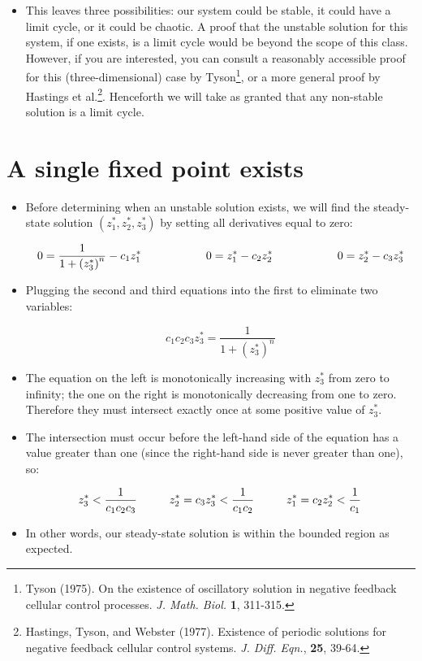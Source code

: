 \documentclass{article}
\begin{document}
\begin{itemize}
\item This leaves three possibilities: our system could be stable, it could have a limit cycle, or it could be chaotic. A proof that the unstable solution for this system, if one exists, is a limit cycle would be beyond the scope of this class. However, if you are interested, you can consult a reasonably accessible proof for this (three-dimensional) case by Tyson\footnote{Tyson (1975). On the existence of oscillatory solution in negative feedback cellular control processes. \textit{J. Math. Biol.} \textbf{1}, 311-315.}, or a more general proof by Hastings et al.\footnote{Hastings, Tyson, and Webster (1977). Existence of periodic solutions for negative feedback cellular control systems. \textit{J. Diff. Eqn.}, \textbf{25}, 39-64.}. Henceforth we will take as granted that any non-stable solution is a limit cycle.
\end{itemize}

\section*{A single fixed point exists}
\begin{itemize}
\item Before determining when an unstable solution exists, we will find the steady-state solution $(z_1^*, z_2^*, z_3^*)$ by setting all derivatives equal to zero:

\[ 0 = \frac{1}{1 + \left( z_3^* \right)^n} - c_1 z_1^* \hspace{2 cm} 0 = z_1^* - c_2z_2^* \hspace{2 cm} 0 = z_2^* - c_3 z_3^* \]

\item Plugging the second and third equations into the first to eliminate two variables:

\[ c_1 c_2 c_3 z_3^* = \frac{1}{1 + \left( z_3^* \right)^n}  \]

\item The equation on the left is monotonically increasing with $z_3^*$ from zero to infinity; the one on the right is monotonically decreasing from one to zero. Therefore they must intersect exactly once at some positive value of $z_3^*$.
\item The intersection must occur before the left-hand side of the equation has a value greater than one (since the right-hand side is never greater than one), so:

\[ z_3^* < \frac{1}{c_1c_2c_3} \hspace{1 cm} z_2^*= c_3 z_3^* < \frac{1}{c_1 c_2} \hspace{1 cm} z_1^* = c_2 z_2^* < \frac{1}{c_1} \]

\item In other words, our steady-state solution is within the bounded region as expected.

\end{itemize}
\end{document}
